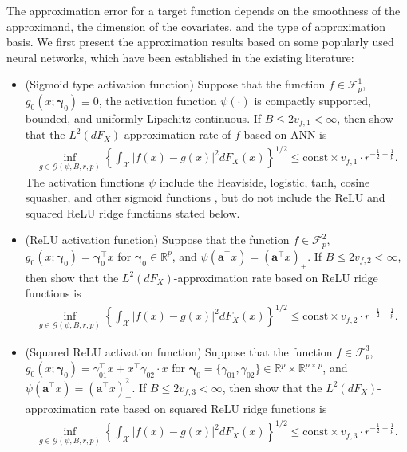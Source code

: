 \documentclass[11pt]{article}
\def\bs{\boldsymbol}
\numberwithin{equation}{section}
\begin{document}
The approximation error for a target function depends on the smoothness of  the approximand, the dimension of the covariates, and the type of approximation basis.  We first present the approximation results based on some popularly used neural networks, which have been  established in the existing literature:
\begin{itemize}
	\item  (Sigmoid type activation function)  Suppose that  the function $f\in\mathcal{F}_p^1$,  $g_0(x;\boldsymbol{\gamma}_0)\equiv 0$, the activation function $\psi(\cdot)$ is compactly supported, bounded, and uniformly Lipschitz  continuous. If  $B\leq 2 v_{f,1}<\infty$,  then \citet[Theorem 2.1]{chen1999improved} show that the $L^2(dF_X)$-approximation rate of $f$ based on ANN is
	\begin{align}\label{rate:ANN}
		\inf_{g\in	\mathcal{G}(\psi,B,r,p)}\left\{\int_{\mathcal{X}}|f(x)-g(x)|^2dF_X(x)\right\}^{1/2}\leq \text{const}\times v_{f,1}\cdot r^{-\frac{1}{2}-\frac{1}{p}}.
	\end{align}
	The activation functions $\psi$ include the Heaviside, logistic, tanh, cosine squasher, and other sigmoid functions \citep{hornik1994degree,makovoz1996random}, but do not include the ReLU and squared ReLU ridge functions stated below.	
	\item  (ReLU activation function) Suppose that the function $f\in\mathcal{F}_p^2$,  $g_0(x;\boldsymbol{\gamma}_0)=\boldsymbol{\gamma}_0^\top x$ for $\boldsymbol{\gamma}_0\in \mathbb{R}^p$, and $\psi(\bs{a}^\top x)=(\bs{a}^\top x)_{+}$.  If $B\leq 2 v_{f,2}<\infty $, then \citet[Theorem 2 and its discussion on page 7651]{klusowski2018approximation} show that the $L^{2}(dF_X)$-approximation rate  based on ReLU ridge functions is
	\begin{align}\label{rate:ReLU}
		\inf_{g\in	\mathcal{G}(\psi,B,r,p)}\left\{\int_{\mathcal{X}}|f(x)-g(x)|^2dF_X(x)\right\}^{1/2}\leq \text{const}\times v_{f,2}\cdot r^{-\frac{1}{2}-\frac{1}{p}}.
	\end{align}
	\item  (Squared ReLU activation function) Suppose that the function $f\in\mathcal{F}^3_p$, $g_0(x;\boldsymbol{\gamma}_0)=\gamma_{01}^\top x+x^\top \gamma_{02} \cdot x$ for $\boldsymbol{\gamma}_0=\{\gamma_{01},\gamma_{02}\}\in \mathbb{R}^p\times \mathbb{R}^{p\times p}$, and $\psi(\bs{a}^\top x)=(\bs{a}^\top x)^2_{+}$. If  $B\leq 2 v_{f,3}<\infty$, then \citet[Theorem 3 and its discussion on page 7651]{klusowski2018approximation} show that the $L^2(dF_X)$-approximation rate  based on squared ReLU ridge functions is
	\begin{align}\label{rate:sqrReLU}
		\inf_{g\in	\mathcal{G}(\psi,B,r,p)}\left\{\int_{\mathcal{X}}|f(x)-g(x)|^2dF_X(x)\right\}^{1/2}\leq \text{const}\times v_{f,3}\cdot r^{-\frac{1}{2}-\frac{1}{p}}.
	\end{align}
\end{itemize}
\end{document}
